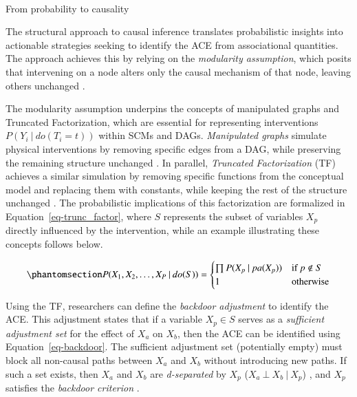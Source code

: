 \documentclass[
  authoryear,
  review,
  1p]{elsarticle}
\makeatletter
\let\oldparagraph\paragraph
\renewcommand{\paragraph}{
    \@ifstar
      \xxxParagraphStar
      \xxxParagraphNoStar
  }
\newcommand{\xxxParagraphStar}[1]{\oldparagraph*{#1}\mbox{}}
\newcommand{\xxxParagraphNoStar}[1]{\oldparagraph{#1}\mbox{}}
\makeatother
\begin{document}
\paragraph{From probability to causality}\label{sec-appendixB33}

The structural approach to causal inference translates probabilistic
insights into actionable strategies seeking to identify the ACE from
associational quantities. The approach achieves this by relying on the
\emph{modularity assumption}, which posits that intervening on a node
alters only the causal mechanism of that node, leaving others unchanged
\citep[pp.~34]{Neal_2020}.

The modularity assumption underpins the concepts of manipulated graphs
and Truncated Factorization, which are essential for representing
interventions \(P(Y_{i} \:|\:do(T_{i}=t))\) within SCMs and DAGs.
\emph{Manipulated graphs} simulate physical interventions by removing
specific edges from a DAG, while preserving the remaining structure
unchanged \citep[pp.~34]{Neal_2020}. In parallel, \emph{Truncated
Factorization} (TF) achieves a similar simulation by removing specific
functions from the conceptual model and replacing them with constants,
while keeping the rest of the structure unchanged \citep{Pearl_2010}.
The probabilistic implications of this factorization are formalized in
Equation~\ref{eq-trunc_factor}, where \(S\) represents the subset of
variables \(X_{p}\) directly influenced by the intervention, while an
example illustrating these concepts follows below.

\begin{equation}\phantomsection\label{eq-trunc_factor}{
P(X_{1}, X_{2}, \dots, X_{P} \:|\:do(S)) =
\begin{cases}
  \prod P(X_{p} \:|\:pa(X_{p}) ) & \text{if} \: p \not\in S \\
  1 \quad & \text{otherwise}
\end{cases}
}\end{equation}

Using the TF, researchers can define the \emph{backdoor adjustment} to
identify the ACE. This adjustment states that if a variable
\(X_{p} \in S\) serves as a \emph{sufficient adjustment set} for the
effect of \(X_{a}\) on \(X_{b}\), then the ACE can be identified using
Equation~\ref{eq-backdoor}. The sufficient adjustment set (potentially
empty) must block all non-causal paths between \(X_{a}\) and \(X_{b}\)
without introducing new paths. If such a set exists, then \(X_{a}\) and
\(X_{b}\) are \emph{d-separated} by \(X_{p}\)
(\(X_{a} \:\bot\:X_{b} \:|\:X_{p}\)) \citep{Pearl_2009}, and \(X_{p}\)
satisfies the \emph{backdoor criterion} \citep[pp.~37]{Neal_2020}.
\end{document}
